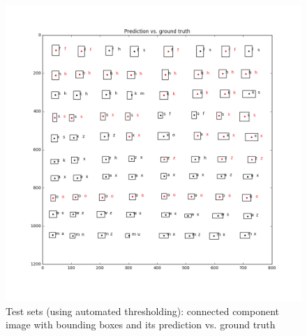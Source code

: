 \documentclass{extarticle}
\theoremstyle{definition}
\theoremstyle{definition}
\begin{document}
\begin{figure}[H]
	\includegraphics[width = 0.5\linewidth]{./figures/test2_gt_Prediction_vs_ground_truth_improve_thresholding.png}	
	\caption{Test sets (using automated thresholding): connected component image with bounding boxes and its prediction vs. ground truth}
	\label{figure5}
\end{figure}
\end{document}
